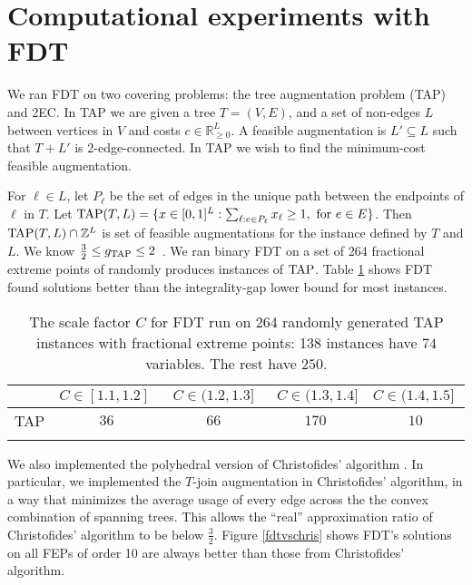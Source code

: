 \section{Computational experiments with FDT}\label{experiment}
We ran FDT on two covering problems: the tree augmentation problem (TAP) and 2EC. In TAP we are given a tree $T=(V,E)$, and a set of non-edges $L$ between vertices in $V$ and costs $c\in \mathbb{R}^{L}_{\geq 0}$. A feasible augmentation is $L'\subseteq L$ such that $T+L'$ is 2-edge-connected. In TAP we wish to find the minimum-cost feasible augmentation. 

For $\ell\in L$, let $P_\ell$ be the set of edges in the unique path between the endpoints of $\ell$ in $T$. Let $\operatorname{TAP}(T,L)=\{x\in [0,1]^{L}: \sum_{\ell: e\in P_\ell}x_\ell \geq 1, \mbox{ for $e\in E$}\}$. Then $\operatorname{TAP}(T,L)\cap \mathbb{Z}^{L}$ is set of feasible augmentations for the instance defined by $T$ and $L$. We know $\frac{3}{2}\leq g_{\operatorname{TAP}}\leq 2$~\cite{fj,32gap}. We ran binary FDT on a set of 264 fractional extreme points of randomly produces instances of $\operatorname{TAP}$. Table \ref{tableTAP} shows FDT found solutions better than the integrality-gap lower bound for most instances.

\begin{table}[h!]
	\begin{small}
		\centering
		\begin{tabular}{c c c c c}
			\hline
			& $C\in [1.1,1.2]\;$ & $\;C\in (1.2,1.3]\;$ &
			$\;C\in (1.3,1.4]$ &\; $C\in (1.4,1.5]\;$ \\ \hline
			TAP & $36$ & $66$ & $170$ & $10$\\  \hline \\
		\end{tabular}\caption{The scale factor $C$ for FDT run on 264 randomly generated TAP instances with fractional extreme points: 138 instances have $74$ variables. The rest have $250$.} \label{tableTAP}
	\end{small}
	
\end{table}


We also implemented the polyhedral version of Christofides' algorithm \cite{Wolsey1980}. In particular, we implemented the $T$-join augmentation in Christofides' algorithm, in a way that minimizes the average usage of every edge across the the convex combination of spanning trees. This allows the ``real'' approximation ratio of Christofides' algorithm to be below $\frac{3}{2}$. Figure \ref{fdtvschris} shows FDT's solutions on all FEPs of order 10 are always better than those from Christofides' algorithm.

